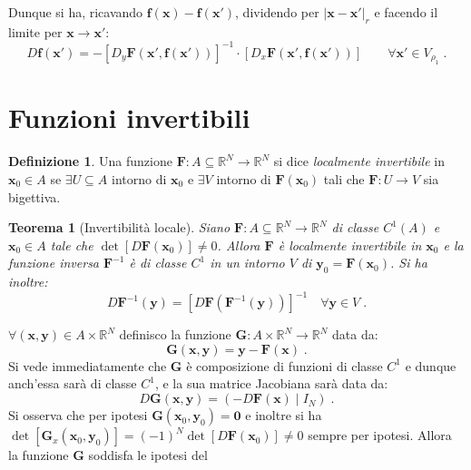 \documentclass[a4paper,12pt]{report}
\theoremstyle{plain}
\newtheorem{thm}{Teorema}[section]
\theoremstyle{definition}
\newtheorem{defn}{Definizione}[section]
\theoremstyle{remark}
\numberwithin{equation}{section}
\begin{document}
Dunque si ha, ricavando $\mathbf{f}(\mathbf{x})-\mathbf{f}(\mathbf{x}')$, dividendo per $|\mathbf{x}-\mathbf{x}'|_r$ e facendo il limite
 per $\mathbf{x} \to \mathbf{x}'$:
\begin{equation}
D\mathbf{f}(\mathbf{x}')=-[D_y\mathbf{F}(\mathbf{x}',\mathbf{f}(\mathbf{x}'))]^{-1}\cdot [D_x\mathbf{F}(\mathbf{x}',\mathbf{f}(\mathbf{x}'))] \qquad \forall \mathbf{x}' \in V_{\rho_1}\;.
\end{equation}
\endproof
\section{Funzioni invertibili}
\begin{defn} Una funzione $\mathbf{F}:A\subseteq\mathbb{R}^N\to\mathbb{R}^N$ si dice \textit{localmente invertibile} in $\mathbf{x}_0\in A$ se $\exists U\subseteq A$ intorno di $\mathbf{x}_0$ e $\exists V$ intorno di $\mathbf{F}(\mathbf{x}_0)$ tali che $\mathbf{F}:U\to V$ sia bigettiva.
\end{defn}
\begin{thm}[Invertibilità locale] Siano $\mathbf{F}:A\subseteq\mathbb{R}^N\to\mathbb{R}^N$ di classe $C^1(A)$ e $\mathbf{x}_0\in A$ tale che $\det[D\mathbf{F}(\mathbf{x}_0)]\ne 0$. Allora $\mathbf{F}$ è localmente invertibile in $\mathbf{x}_0$ e la funzione inversa $\mathbf{F}^{-1}$ è di classe $C^1$ in un intorno $V$ di $\mathbf{y}_0=\mathbf{F}(\mathbf{x}_0)$. Si ha inoltre:
\begin{equation}
D\mathbf{F}^{-1}(\mathbf{y})=[D\mathbf{F}(\mathbf{F}^{-1}(\mathbf{y}))]^{-1}\quad \forall \mathbf{y}\in V\;.
\end{equation}
\end{thm}
\proof $\forall (\mathbf{x},\mathbf{y})\in A\times\mathbb{R}^N$ definisco la funzione $\mathbf{G}:A\times\mathbb{R}^N\to\mathbb{R}^N$ data da:
\begin{equation}
\mathbf{G}(\mathbf{x},\mathbf{y})=\mathbf{y}-\mathbf{F}(\mathbf{x})\;.
\end{equation}
Si vede immediatamente che $\mathbf{G}$ è composizione di funzioni di classe $C^1$ e dunque anch'essa sarà di classe $C^1$, e la sua 
matrice Jacobiana sarà data da:
\begin{equation}
D\mathbf{G}(\mathbf{x},\mathbf{y})=(-D\mathbf{F}(\mathbf{x})\;|\;I_N)\;.
\end{equation}
Si osserva che per ipotesi $\mathbf{G}(\mathbf{x}_0,\mathbf{y}_0)=\mathbf{0}$ e inoltre si ha $\det[\mathbf{G}_x(\mathbf{x}_0,
\mathbf{y}_0)]=(-1)^N\det[D\mathbf{F}(\mathbf{x}_0)]\ne 0$ sempre per ipotesi. Allora la funzione $\mathbf{G}$ soddisfa le ipotesi del 
\end{document}
